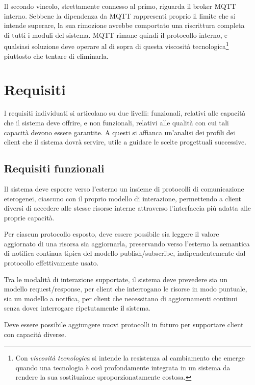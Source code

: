 Il secondo vincolo, strettamente connesso al primo, riguarda il broker \ac{MQTT} interno. Sebbene la dipendenza da \ac{MQTT} rappresenti proprio il limite che si intende superare, la sua rimozione avrebbe comportato una riscrittura completa di tutti i moduli del sistema. \ac{MQTT} rimane quindi il protocollo interno, e qualsiasi soluzione deve operare al di sopra di questa viscosità tecnologica\footnote{Con \textit{viscosità tecnologica} si intende la resistenza al cambiamento che emerge quando una tecnologia è così profondamente integrata in un sistema da rendere la sua sostituzione sproporzionatamente costosa.} piuttosto che tentare di eliminarla.
%
\section{Requisiti}
\label{sec:requisiti}
%
I requisiti individuati si articolano su due livelli: funzionali, relativi alle capacità che il sistema deve offrire, e non funzionali, relativi alle qualità con cui tali capacità devono essere garantite. A questi si affianca un'analisi dei profili dei client che il sistema dovrà servire, utile a guidare le scelte progettuali successive.
%
\subsection{Requisiti funzionali}
\label{subsec:requisiti-funzionali}
%
%
\begin{reqfun}
  \item \label{req:rqf1} Il sistema deve esporre verso l'esterno un insieme di protocolli di comunicazione eterogenei, ciascuno con il proprio modello di interazione, permettendo a client diversi di accedere alle stesse risorse interne attraverso l'interfaccia più adatta alle proprie capacità.

  \item \label{req:rqf2} Per ciascun protocollo esposto, deve essere possibile sia leggere il valore aggiornato di una risorsa sia aggiornarla, preservando verso l'esterno la semantica di notifica continua tipica del modello publish/subscribe, indipendentemente dal protocollo effettivamente usato.

  \item \label{req:rqf3} Tra le modalità di interazione supportate, il sistema deve prevedere sia un modello request/response, per client che interrogano le risorse in modo puntuale, sia un modello a notifica, per client che necessitano di aggiornamenti continui senza dover interrogare ripetutamente il sistema.

  \item \label{req:rqf4} Deve essere possibile aggiungere nuovi protocolli in futuro per supportare client con capacità diverse.
\end{reqfun}
%
